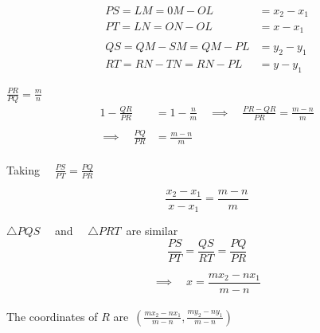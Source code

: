 \documentclass[11pt,a4paper]{article}
\theoremstyle{definition}
\begin{document}
\begin{align*}
PS = LM = 0M - OL & = x_2 - x_1\\
PT = LN = ON - OL &  = x - x_1\\\\
QS  = QM - SM = QM - PL & = y_2 - y_1\\
RT = RN - TN = RN - PL  & = y - y_1
\end{align*}



$\frac{PR}{PQ}  = \frac{m}{n}$\\



\begin{align*}
1 - \frac{QR}{PR} & = 1 - \frac{n}{m}\quad  \implies \quad  \frac{PR - QR}{PR} = \frac{m - n}{m}\\\\
\implies\quad  \frac{PQ}{PR} & = \frac{m - n}{m}\\
\end{align*}




Taking $\quad \frac{PS}{PT} = \frac{PQ}{PR}$

$$\frac{x_2 - x_1}{x - x_1} = \frac{m - n}{m}$$


$\triangle PQS\quad $ and $\quad  \triangle PRT\,$ are similar 
$$\frac{PS}{PT}= \frac{QS}{RT} = \frac{PQ}{PR}$$

$$\implies\quad  x = \frac{mx_2 - nx_1}{m-n}$$\\



The coordinates of $R$ are \,$\left(\frac{mx_2 - nx_1}{m - n}, \frac{my_2 - ny_1}{m - n}\right)$\\\\
\end{document}
